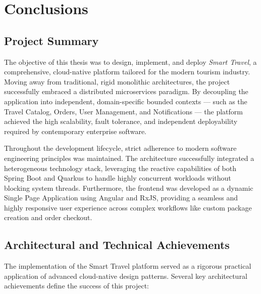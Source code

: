 \chapter{Conclusions}
\label{ch:conclusions}

\section{Project Summary}

The objective of this thesis was to design, implement, and deploy \textit{Smart Travel}, a comprehensive, cloud-native platform tailored for the modern tourism industry. Moving away from traditional, rigid monolithic architectures, the project successfully embraced a distributed microservices paradigm. By decoupling the application into independent, domain-specific bounded contexts — such as the Travel Catalog, Orders, User Management, and Notifications — the platform achieved the high scalability, fault tolerance, and independent deployability required by contemporary enterprise software.

Throughout the development lifecycle, strict adherence to modern software engineering principles was maintained. The architecture successfully integrated a heterogeneous technology stack, leveraging the reactive capabilities of both Spring Boot and Quarkus to handle highly concurrent workloads without blocking system threads. Furthermore, the frontend was developed as a dynamic Single Page Application using Angular and RxJS, providing a seamless and highly responsive user experience across complex workflows like custom package creation and order checkout.

\section{Architectural and Technical Achievements}

The implementation of the Smart Travel platform served as a rigorous practical application of advanced cloud-native design patterns. Several key architectural achievements define the success of this project:


